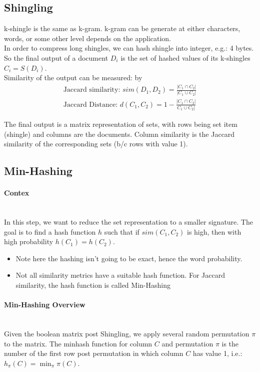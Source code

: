 \subsection{Shingling} 
k-shingle is the same as k-gram. k-gram can be generate at either characters, words, or some other level depends on the application. \\

In order to compress long shingles, we can hash shingle into integer, e.g.: 4 bytes. So the final output of a document $D_i$ is the set of hashed values of its k-shingles $C_i = S(D_i)$.\\

Similarity of the output can be measured:  by 
    \begin{align*}
        \text{Jaccard similarity: } sim(D_1, D_2) = \frac{|C_1 \cap C_2|}{|C_1 \cup C_2|} \\
        \text{Jaccard Distance: } d(C_1, C_2) = 1 -  \frac{|C_1 \cap C_2|}{C_1 \cup C_2|}
    \end{align*}

The final output is a matrix representation of sets, with rows being set item (shingle) and columns are the documents.  Column similarity is the Jaccard similarity of the corresponding sets (b/c rows with value 1). 


\subsection{Min-Hashing} 
\paragraph{Contex} \mbox{}\\
In this step, we want to reduce the set representation to a smaller signature. The  goal is to find a hash function $h$ such that if $sim(C_1, C_2)$ is high, then with high probability $h(C_1) = h(C_2)$. 
    \begin{itemize}
        \item Note here the hashing isn't going to be exact, hence the word probability.
        \item Not all similarity metrics have a suitable hash function. For Jaccard similarity, the hash function is called Min-Hashing
    \end{itemize}

\paragraph{Min-Hashing Overview} \mbox{}\\
Given the boolean matrix post Shingling, we apply several random permutation $\pi$ to the matrix. The minhash function for column $C$ and permutation $\pi$ is the number of the first row post permutation in which column $C$ has value 1, i.e.: $h_\pi(C) = \min_\pi \pi(C)$. \\

